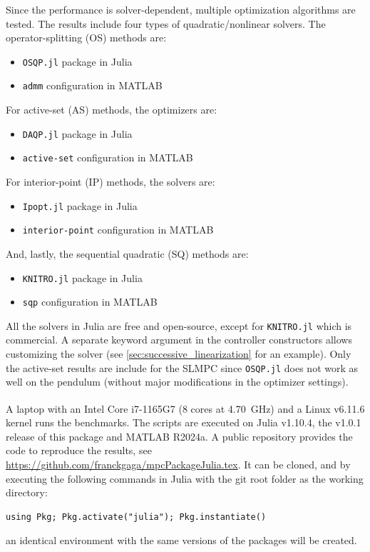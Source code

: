 Since the performance is solver-dependent, multiple optimization algorithms are tested. The results include four types of quadratic/nonlinear solvers. The operator-splitting (OS) methods are: 
\begin{itemize}
    \item \texttt{OSQP.jl} package in Julia \citep{osqp}
    \item \texttt{admm} configuration in MATLAB \citep{admm}
\end{itemize}
For active-set (AS) methods, the optimizers are: 
\begin{itemize}
    \item \texttt{DAQP.jl} package in Julia \citep{daqp}
    \item \texttt{active-set} configuration in MATLAB \citep{activeset}
\end{itemize}
For interior-point (IP) methods, the solvers are: 
\begin{itemize}
    \item \texttt{Ipopt.jl} package in Julia \citep{ipopt}
    \item \texttt{interior-point} configuration in MATLAB \citep{interiorpoint}
\end{itemize}
And, lastly, the sequential quadratic (SQ) methods are:
\begin{itemize}
    \item \texttt{KNITRO.jl} package in Julia \citep{knitro}
    \item \texttt{sqp} configuration in MATLAB \citep{sqp}
\end{itemize}

All the solvers in Julia are free and open-source, except for \texttt{KNITRO.jl} which is commercial. A separate keyword argument in the controller constructors allows customizing the solver (see \cref{sec:successive_linearization} for an example). Only the active-set results are include for the SLMPC since \texttt{OSQP.jl} does not work as well on the pendulum (without major modifications in the optimizer settings).

A laptop with an Intel\textsuperscript{\textregistered} Core\textsuperscript{\texttrademark} i7-1165G7 (8 cores at \SI{4.70}{\giga\hertz}) and a Linux v6.11.6 kernel runs the benchmarks. The scripts are executed on Julia v1.10.4, the v1.0.1 release of this package and MATLAB R2024a. A public repository provides the code to reproduce the results, see \url{https://github.com/franckgaga/mpcPackageJulia.tex}.
It can be cloned, and by executing the following commands in Julia with the git root folder as the working directory:
\begin{verbatim}
using Pkg; Pkg.activate("julia"); Pkg.instantiate()
\end{verbatim}
an identical environment with the same versions of the packages will be created.

